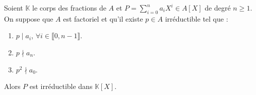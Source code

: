   \begin{theorem}
    \label{critere-d-eisenstein-6}
    Soient $\mathbb{K}$ le corps des fractions de $A$ et $P = \sum_{i=0}^n a_i X^i \in A[X]$ de degré $n \geq 1$. On suppose que $A$ est factoriel et qu'il existe $p \in A$ irréductible tel que :
    \begin{enumerate}[label=(\roman*)]
      \item \label{critere-d-eisenstein-7} $p \mid a_i$, $\forall i \in \llbracket 0, n-1 \rrbracket$.
      \item \label{critere-d-eisenstein-8} $p \nmid a_n$.
      \item \label{critere-d-eisenstein-9} $p^2 \nmid a_0$.
    \end{enumerate}
    Alors $P$ est irréductible dans $\mathbb{K}[X]$.
  \end{theorem}

